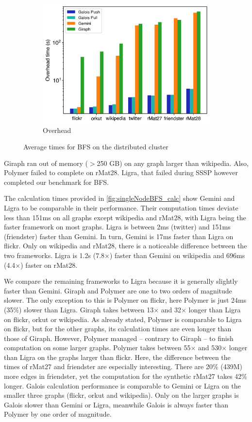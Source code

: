 \begin{figure}[h]
\begin{subfigure}{0.32\textwidth}
		\includegraphics[width=\linewidth]{../../plots/distributedBFS_overheadTime.png}
		\caption{Overhead}
		\label{fig:distributedBFS_overhead}
	\end{subfigure}
	\hfil
	\caption{Average times for BFS on the distributed cluster}
	\label{fig:distributedBFS}
\end{figure}
Giraph ran out of memory ($>$250 GB) on any graph larger than wikipedia. Also, Polymer failed to complete on rMat28. Ligra, that failed during SSSP however completed our benchmark for BFS.

The calculation times provided in \autoref{fig:singleNodeBFS_calc} show Gemini and Ligra to be comparable in their performance. 
Their computation times deviate less than 151ms on all graphs except wikipedia and rMat28, with Ligra being the faster framework on most graphs.
Ligra is between 2ms (twitter) and 151ms (friendster) faster than Gemini.
In turn, Gemini is 17ms faster than Ligra on flickr.
Only on wikipedia and rMat28, there is a noticeable difference between the two frameworks. Ligra is 1.2s (7.8$\times$) faster than Gemini on wikipedia and 696ms (4.4$\times$) faster on rMat28.

We compare the remaining frameworks to Ligra because it is generally slightly faster than Gemini.
Giraph and Polymer are one to two orders of magnitude slower. The only exception to this is Polymer on flickr, here Polymer is just 24ms (35\%) slower than Ligra.
Giraph takes between 13$\times$ and 32$\times$ longer than Ligra on flickr, orkut or wikipedia.
As already stated, Polymer is comparable to Ligra on flickr, but for the other graphs, its calculation times are even longer than those of Giraph. However, Polymer managed -- contrary to Giraph -- to finish computation on some larger graphs.
Polymer takes between 55$\times$ and 530$\times$ longer than Ligra on the graphs larger than flickr.
Here, the difference between the times of rMat27 and friendster are especially interesting. There are 20\% (439M) more edges in friendster, yet the computation for the synthetic rMat27 takes 42\% longer.
Galois calculation performance is comparable to Gemini or Ligra on the smaller three graphs (flickr, orkut and wikipedia).
Only on the larger graphs is Galois slower than Gemini or Ligra, meanwhile Galois is always faster than Polymer by one order of magnitude.

